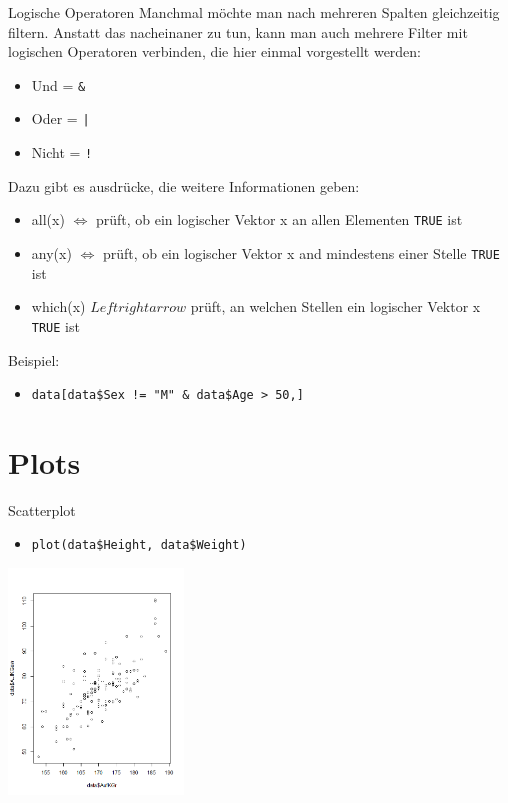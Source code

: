 \documentclass[aspectratio = 169]{chariteBeamer}
\begin{document}
\begin{frame}[fragile]{Logische Operatoren}
Manchmal möchte man nach mehreren Spalten gleichzeitig filtern. Anstatt das nacheinaner zu tun, kann man auch mehrere Filter mit logischen Operatoren verbinden, die hier einmal vorgestellt werden: \\
\begin{itemize}
			\item  Und = \verb+&+
			\item  Oder = \verb+|+
			\item Nicht = \verb+!+
\end{itemize}
Dazu gibt es ausdrücke, die weitere Informationen geben:
\begin{itemize}
			\item all(x) $\Leftrightarrow$ prüft, ob ein logischer Vektor x an allen Elementen \verb+TRUE+ ist
			\item any(x) $\Leftrightarrow$ prüft, ob ein logischer Vektor x and mindestens einer Stelle \verb+TRUE+ ist
			\item which(x) $Leftrightarrow$ prüft, an welchen Stellen ein logischer Vektor x \verb+TRUE+ ist
\end{itemize}
Beispiel:
	\begin{itemize}
		\item  \verb+data[data$Sex != "M" & data$Age > 50,]+
	\end{itemize}
\end{frame}


\section{Plots}

\begin{frame}[fragile]{Scatterplot}
	\begin{itemize}
		\item \verb+plot(data$Height, data$Weight)+
	\end{itemize}
			
	\begin{center}
		\includegraphics[height=6cm]{Scatterplot}
	\end{center}
\end{frame}
\end{document}
